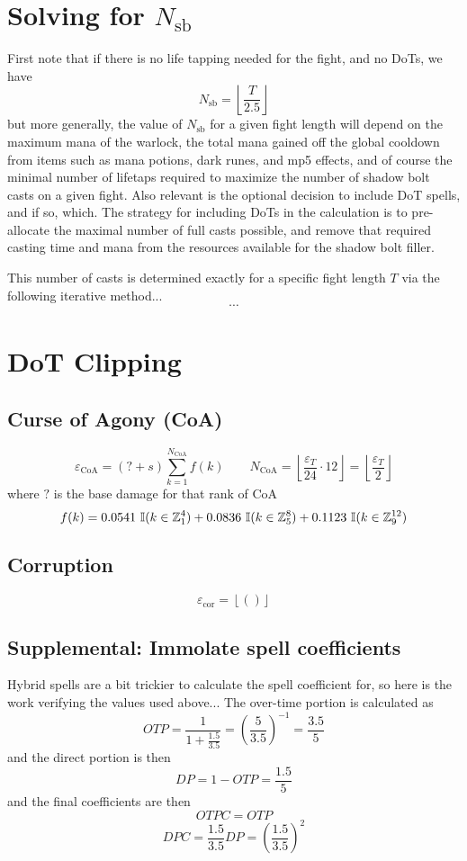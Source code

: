 \section*{Solving for $N_\text{sb}$}
%
First note that if there is no life tapping needed for the fight, and no DoTs, we have
%
$$
N_\text{sb} = \left\lfloor \frac{T}{2.5} \right\rfloor
$$
%
but more generally, the value of $N_\text{sb}$ for a given fight length will depend on the maximum mana of the warlock, the total mana gained off the global cooldown from items such as mana potions, dark runes, and mp5 effects, and of course the minimal number of lifetaps required to maximize the number of shadow bolt casts on a given fight. Also relevant is the optional decision to include DoT spells, and if so, which. The strategy for including DoTs in the calculation is to pre-allocate the maximal number of full casts possible, and remove that required casting time and mana from the resources available for the shadow bolt filler.

This number of casts is determined exactly for a specific fight length $T$ via the following iterative method...
%
$$
\cdots
$$



\section*{DoT Clipping}

\subsection*{Curse of Agony (CoA)}
%
$$
\varepsilon_\text{CoA} = (? + s) \sum_{k=1}^{N_\text{CoA}} f(k)
\qquad
N_\text{CoA} = \left\lfloor \frac{\varepsilon_T}{24} \cdot 12 \right\rfloor = \left\lfloor \frac{\varepsilon_T}{2} \right\rfloor
$$
%
where $?$ is the base damage for that rank of CoA
%
$$
f(k) = 0.0541 \ \mathbb{I}(k \in \mathbb{Z}_1^4)
+ 0.0836 \ \mathbb{I}(k \in \mathbb{Z}_5^8)
+ 0.1123 \ \mathbb{I}(k \in \mathbb{Z}_9^{12})
$$

\subsection*{Corruption}
%
$$
\varepsilon_\text{cor} = \left\lfloor () \right\rfloor
$$



\subsection*{Supplemental: Immolate spell coefficients}
%
Hybrid spells are a bit trickier to calculate the spell coefficient for, so here is the work verifying the values used above... The over-time portion is calculated as
%
$$
OTP = \frac{1}{1 + \frac{1.5}{3.5}}
= (\frac{5}{3.5})^{-1}
= \frac{3.5}{5}
$$
%
and the direct portion is then
%
$$
DP = 1 - OTP = \frac{1.5}{5}
$$
%
and the final coefficients are then
%
$$
OTPC = OTP
$$
$$
DPC = \frac{1.5}{3.5} DP
= (\frac{1.5}{3.5})^2
$$




